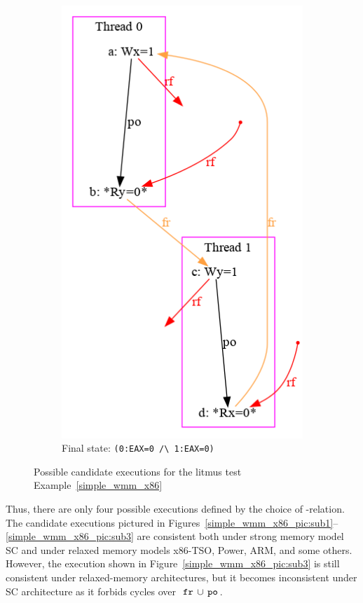 \begin{figure}[!htb]
\begin{subfigure}[t]{.23\textwidth}
  \includegraphics[width=.9\linewidth]{img/my/sb-example/SB-dot-4.png}
  \caption{Final state: \texttt{(0:EAX=0~/\textbackslash~1:EAX=0)}}
  \label{simple_wmm_x86_pic:sub4}
\end{subfigure}
\hfill
\caption{Possible candidate executions for the litmus test Example~\ref{simple_wmm_x86}}
\label{simple_wmm_x86_pic}
\end{figure}

Thus, there are only four possible executions defined by the choice of \rf-relation.
The candidate executions pictured in Figures~\ref{simple_wmm_x86_pic:sub1}--\ref{simple_wmm_x86_pic:sub3} are consistent both under strong memory model SC and under relaxed memory models x86-TSO, Power, ARM, and some others.
However, the execution shown in Figure~\ref{simple_wmm_x86_pic:sub3} is still consistent under relaxed-memory architectures, but it becomes inconsistent under SC architecture as it forbids cycles over~$\,\mathtt{fr}\,\cup\,\mathtt{po}\,$.


